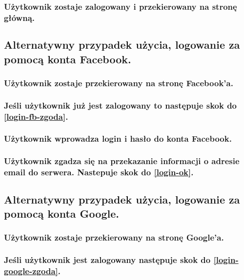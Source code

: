\documentclass[a4paper]{article}
\begin{document}
\subsubsection{Użytkownik zostaje zalogowany i przekierowany na stronę główną. \label{login-ok}}

\subsection{Alternatywny przypadek użycia, logowanie za pomocą konta Facebook. \label{login-fb}}

\subsubsection{Użytkownik zostaje przekierowany na stronę Facebook'a.}

\subsubsection{Jeśli użytkownik już jest zalogowany to następuje skok do \ref{login-fb-zgoda}.}

\subsubsection{Użytkownik wprowadza login i hasło do konta Facebook.}

\subsubsection{Użytkownik zgadza się na przekazanie informacji o adresie email do serwera. Nastepuje skok do \ref{login-ok}. \label{login-fb-zgoda}}


\subsection{Alternatywny przypadek użycia, logowanie za pomocą konta Google. \label{login-google}}

\subsubsection{Użytkownik zostaje przekierowany na stronę Google'a.}

\subsubsection{Jeśli użytkownik jest zalogowany następuje skok do \ref{login-google-zgoda}.}
\end{document}
